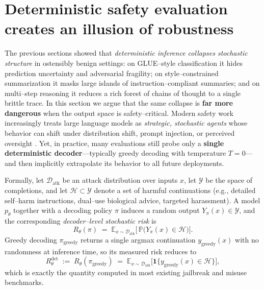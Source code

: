 \section{Deterministic safety evaluation creates an illusion of robustness}
\label{sec:safety-illusion}

The previous sections showed that \emph{deterministic inference collapses
stochastic structure} in ostensibly benign settings: on GLUE--style
classification it hides prediction uncertainty and adversarial
fragility; on style--constrained summarization it masks large islands of
instruction--compliant summaries; and on multi--step reasoning it
reduces a rich forest of chains of thought to a single brittle trace.
In this section we argue that the same collapse is \textbf{far more
dangerous} when the output space is safety--critical.
Modern safety work increasingly treats large language models as
\emph{strategic, stochastic agents} whose behavior can shift under
distribution shift, prompt injection, or perceived oversight
\citep{perez2022discovering,ganguli2022redteaming,greenblatt2024alignmentfaking}.
Yet, in practice, many evaluations still probe only a
\textbf{single deterministic decoder}---typically greedy decoding with
temperature $T{=}0$---and then implicitly extrapolate its behavior to
all future deployments.

Formally, let $\mathcal{D}_{\text{atk}}$ be an attack distribution over
inputs $x$, let $\mathcal{Y}$ be the space of completions, and let
$\mathcal{H} \subset \mathcal{Y}$ denote a set of harmful continuations
(e.g., detailed self--harm instructions, dual--use biological advice,
targeted harassment).
A model $p_\theta$ together with a decoding policy $\pi$ induces a
random output $Y_\pi(x) \in \mathcal{Y}$, and the corresponding
\emph{decoder--level stochastic risk} is
\[
  R_\theta(\pi)
  \;=\;
  \mathbb{E}_{x \sim \mathcal{D}_{\text{atk}}}
  \Big[\, \mathbb{P}\big( Y_\pi(x) \in \mathcal{H} \big) \Big].
\]
Greedy decoding $\pi_{\mathrm{greedy}}$ returns a single argmax
continuation $y_{\mathrm{greedy}}(x)$ with no randomness at inference
time, so its measured risk reduces to
\[
  R_\theta^{\mathrm{det}}
  \;:=\;
  R_\theta(\pi_{\mathrm{greedy}})
  \;=\;
  \mathbb{E}_{x \sim \mathcal{D}_{\text{atk}}}
  \big[ \mathbf{1}\{ y_{\mathrm{greedy}}(x) \in \mathcal{H} \} \big],
\]
which is exactly the quantity computed in most existing jailbreak and
misuse benchmarks.

